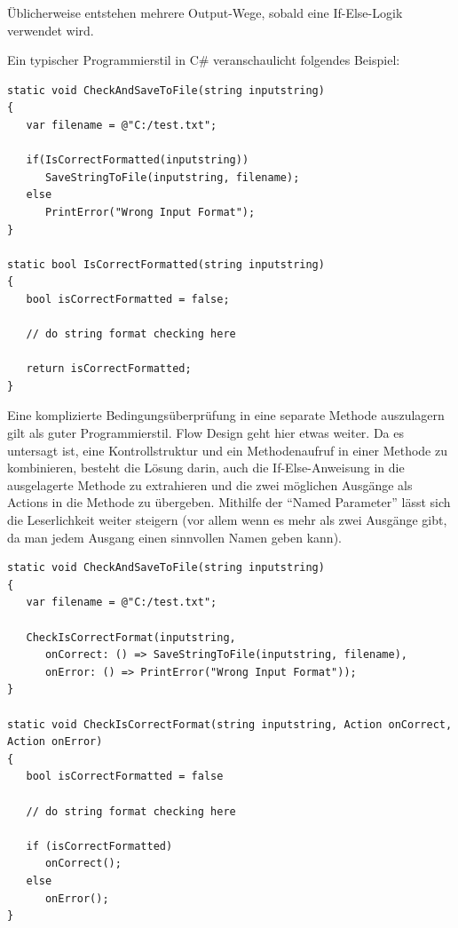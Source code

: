 Üblicherweise entstehen mehrere Output-Wege, sobald eine
If-Else-Logik verwendet wird.

\pagebreak

Ein typischer Programmierstil in C\# veranschaulicht folgendes Beispiel:
\\
\begin{lstlisting}[caption= {Typerischer Programmierstil, der nicht IOSP-konform ist}]
static void CheckAndSaveToFile(string inputstring)
{
   var filename = @"C:/test.txt";

   if(IsCorrectFormatted(inputstring))
      SaveStringToFile(inputstring, filename);
   else
      PrintError("Wrong Input Format");
}

static bool IsCorrectFormatted(string inputstring)
{
   bool isCorrectFormatted = false;

   // do string format checking here

   return isCorrectFormatted;
}
\end{lstlisting}

Eine komplizierte Bedingungsüberprüfung in eine separate Methode auszulagern
gilt als guter Programmierstil. Flow Design geht hier etwas weiter. Da es
untersagt ist, eine Kontrollstruktur und ein Methodenaufruf in einer
Methode zu kombinieren, besteht die Lösung darin, auch die If-Else-Anweisung in
die ausgelagerte Methode zu extrahieren und die zwei möglichen Ausgänge als Actions
in die Methode zu übergeben. Mithilfe der \enquote{Named Parameter} lässt sich die
Leserlichkeit weiter steigern (vor allem wenn es mehr als zwei Ausgänge
gibt, da man jedem Ausgang einen sinnvollen Namen geben kann).
\\
\begin{lstlisting}[caption= {IOSP-konforme Variante}]
static void CheckAndSaveToFile(string inputstring)
{
   var filename = @"C:/test.txt";

   CheckIsCorrectFormat(inputstring, 
      onCorrect: () => SaveStringToFile(inputstring, filename),
      onError: () => PrintError("Wrong Input Format"));
}

static void CheckIsCorrectFormat(string inputstring, Action onCorrect, Action onError)
{
   bool isCorrectFormatted = false

   // do string format checking here

   if (isCorrectFormatted) 
      onCorrect();
   else
      onError();
}
\end{lstlisting}

